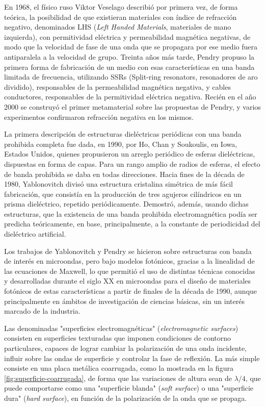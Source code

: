En 1968, el físico ruso Viktor Veselago describió por primera vez, de forma teórica, la posibilidad de que existieran materiales con índice de refracción negativo, denominados LHS (\textit{Left Handed Materials}, materiales de mano izquierda), con permitividad eléctrica y permeabilidad magnética negativas, de modo que la velocidad de fase de una onda que se propagara por ese medio fuera antiparalela a la velocidad de grupo. Treinta años más tarde, Pendry propuso la primera forma de fabricación de un medio con esas características en una banda limitada de frecuencia, utilizando SSRs (Split-ring resonators, resonadores de aro dividido), responsables de la permeabilidad magnética negativa, y cables conductores, responsables de la permitividad eléctrica negativa. Recién en el año 2000 se construyó el primer metamaterial sobre las propuestas de Pendry, y varios experimentos confirmaron refracción negativa en los mismos.

La primera descripción de estructuras dieléctricas periódicas con una banda prohibida completa fue dada, en 1990, por Ho, Chan y Soukoulis, en Iowa, Estados Unidos, quienes propusieron un arreglo periódico de esferas dieléctricas, dispuestas en forma de capas. Para un rango amplio de radios de esferas, el efecto de banda prohibida se daba en todas direcciones. Hacia fines de la década de 1980, Yablonovitch divisó una estructura cristalina simétrica de más fácil fabricación, que consistía en la producción de tres agujeros cilíndricos en un prisma dieléctrico, repetido periódicamente. Demostró, además, usando dichas estructuras, que la existencia de una banda prohibida electromagnética podía ser predicha teóricamente, en base, principalmente, a la constante de periodicidad del dieléctrico artificial.

Los trabajos de Yablonovitch y Pendry se hicieron sobre estructuras con banda de interés en microondas, pero bajo modelos fotónicos, gracias a la linealidad de las ecuaciones de Maxwell, lo que permitió el uso de distintas técnicas conocidas y desarrolladas durante el siglo XX en microondas para el diseño de materiales fotónicos de estas características a partir de finales de la década de 1990, aunque principalmente en ámbitos de investigación de ciencias básicas, sin un interés marcado de la industria.

Las denominadas "superficies electromagnéticas" (\textit{electromagnetic surfaces}) consisten en superficies texturadas que imponen condiciones de contorno particulares, capaces de lograr cambiar la polarización de una onda incidente, influir sobre las ondas de superficie y controlar la fase de reflexión. La más simple consiste en una placa metálica coarrugada, como la mostrada en la figura \ref{fig:superficie-coarrugada}, de forma que las variaciones de altura sean de $\lambda/4$, que puede comportarse como una "superficie blanda" (\textit{soft surface}) o una "superficie dura" (\textit{hard surface}), en función de la polarización de la onda que se propaga.

